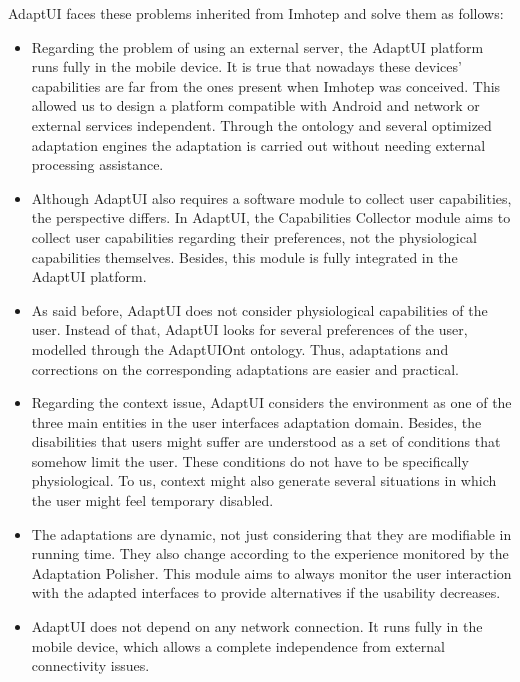 AdaptUI faces these problems inherited from Imhotep and solve them as follows:

\begin{itemize}
  \item Regarding the problem of using an external server, the AdaptUI platform
  runs fully in the mobile device. It is true that nowadays these devices'
  capabilities are far from the ones present when Imhotep was conceived. This
  allowed us to design a platform compatible with Android and network or 
  external services independent. Through the ontology and several optimized 
  adaptation engines the adaptation is carried out without needing external 
  processing assistance.
  
  \item Although AdaptUI also requires a software module to collect user
  capabilities, the perspective differs. In AdaptUI, the Capabilities Collector
  module aims to collect user capabilities regarding their preferences, not
  the physiological capabilities themselves. Besides, this module is fully
  integrated in the AdaptUI platform.
  
  \item As said before, AdaptUI does not consider physiological capabilities of
  the user. Instead of that, AdaptUI looks for several preferences of the user,
  modelled through the AdaptUIOnt ontology. Thus, adaptations and corrections
  on the corresponding adaptations are easier and practical.
  
  \item Regarding the context issue, AdaptUI considers the environment as one 
  of the three main entities in the user interfaces adaptation domain. Besides,
  the disabilities that users might suffer are understood as a set of conditions
  that somehow limit the user. These conditions do not have to be specifically
  physiological. To us, context might also generate several situations in which
  the user might feel temporary disabled.
  
  \item The adaptations are dynamic, not just considering that they are 
  modifiable in running time. They also change according to the experience 
  monitored by the Adaptation Polisher. This module aims to always monitor the 
  user interaction with the adapted interfaces to provide alternatives if the 
  usability decreases.
  
  \item AdaptUI does not depend on any network connection. It runs fully in the
  mobile device, which allows a complete independence from external connectivity
  issues.
\end{itemize}

